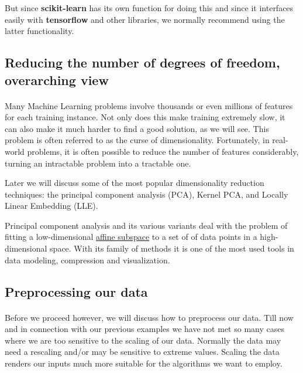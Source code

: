 \documentclass[%
oneside,                 %
final,                   %
10pt]{article}
\begin{document}
But since \textbf{scikit-learn} has its own function for doing this and since
it interfaces easily with \textbf{tensorflow} and other libraries, we
normally recommend using the latter functionality.

\subsection*{Reducing the number of degrees of freedom, overarching view}

\paragraph{}

Many Machine Learning problems involve thousands or even millions of
features for each training instance. Not only does this make training
extremely slow, it can also make it much harder to find a good
solution, as we will see. This problem is often referred to as the
curse of dimensionality.  Fortunately, in real-world problems, it is
often possible to reduce the number of features considerably, turning
an intractable problem into a tractable one.

Later  we will discuss some of the most popular dimensionality reduction
techniques: the principal component analysis (PCA), Kernel PCA, and
Locally Linear Embedding (LLE).  

Principal component analysis and its various variants deal with the
problem of fitting a low-dimensional \href{{https://en.wikipedia.org/wiki/Affine_space}}{affine
subspace} to a set of of
data points in a high-dimensional space. With its family of methods it
is one of the most used tools in data modeling, compression and
visualization.



\subsection*{Preprocessing our data}

\paragraph{}

Before we proceed however, we will discuss how to preprocess our
data. Till now and in connection with our previous examples we have
not met so many cases where we are too sensitive to the scaling of our
data. Normally the data may need a rescaling and/or may be sensitive
to extreme values. Scaling the data renders our inputs much more
suitable for the algorithms we want to employ.
\end{document}
